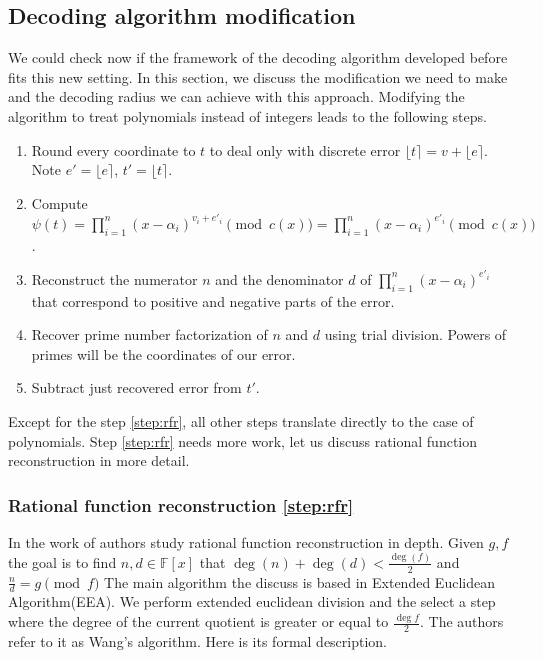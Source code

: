 \documentclass[12pt]{article}
\begin{document}
\subsection{Decoding algorithm modification}
\label{subsec:decoding_polynomials}

We could check now if the framework of the decoding algorithm developed before fits this new setting. In this section, we discuss the modification we need to make and the decoding radius we can achieve with this approach. Modifying the algorithm to treat polynomials instead of integers leads to the following steps.

\begin{enumerate}
    \item Round every coordinate to $t$ to deal only with discrete error $\lfloor t \rceil = v + \lfloor e \rceil$. Note $e' = \lfloor e \rceil$, $t' = \lfloor t \rceil$.
    \item Compute $\psi(t) = \prod_{i=1}^{n}(x - \alpha_{i})^{v_{i} + e'_i} \pmod{c(x)} = \prod_{i=1}^{n}(x - \alpha_{i})^{e'_i} \pmod{c(x)}$.
    \item \label{step:rfr} Reconstruct the numerator $n$ and the denominator $d$ of $\prod_{i=1}^{n}(x - \alpha_{i})^{e'_i}$ that correspond to positive and negative parts of the error.
    \item Recover prime number factorization of $n$ and $d$ using trial division. Powers of primes will be the coordinates of our error.
    \item Subtract just recovered error from $t'$.
\end{enumerate}

Except for the step \ref{step:rfr}, all other steps translate directly to the case of polynomials. Step \ref{step:rfr} needs more work, let us discuss rational function reconstruction in more detail.

\subsubsection{Rational function reconstruction \ref{step:rfr}}
\label{subsubsec:rfr}
In the work of \cite{[KM06]} authors study rational function reconstruction in depth.  Given $g,f$ the goal is to find $n, d \in \mathbb{F}[x]$ that $\deg(n) + \deg(d) < \frac{\deg(f)}{2}$ and $\frac{n}{d} = g \pmod{f}$ The main algorithm the discuss is based in Extended Euclidean Algorithm(EEA). We perform extended euclidean division and the select a step where the degree of the current quotient is greater or equal to $\frac{\deg f}{2}$. The authors refer to it as Wang's algorithm. Here is its formal description.
\end{document}
